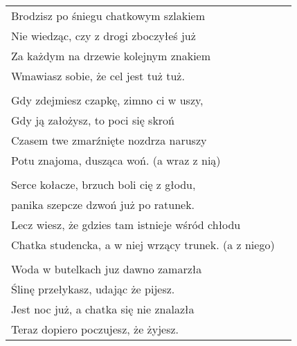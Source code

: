\documentclass[a5paper]{article}
\begin{document}
\noindent
\begin{tabular}{@{}p{9.50cm}p{3cm}@{}}
Brodzisz po śniegu chatkowym szlakiem \\
Nie wiedząc, czy z drogi zboczyłeś już\\
Za każdym na drzewie kolejnym znakiem\\
Wmawiasz sobie, że cel jest tuż tuż.\\ \\

Gdy zdejmiesz czapkę, zimno ci w uszy,\\
Gdy ją założysz, to poci się skroń\\
Czasem twe zmarźnięte nozdrza naruszy\\
Potu znajoma, dusząca woń. (a wraz z nią)\\\\

Serce kołacze, brzuch boli cię z głodu,\\
panika szepcze dzwoń już po ratunek.\\
Lecz wiesz, że gdzies tam istnieje wśród chłodu\\
Chatka studencka, a w niej wrzący trunek. (a z niego)\\\\

Woda w butelkach juz dawno zamarzła\\
Ślinę przełykasz, udając że pijesz.\\
Jest noc już, a chatka się nie znalazła\\
Teraz dopiero poczujesz, że żyjesz.
\end{tabular}
\end{document}
